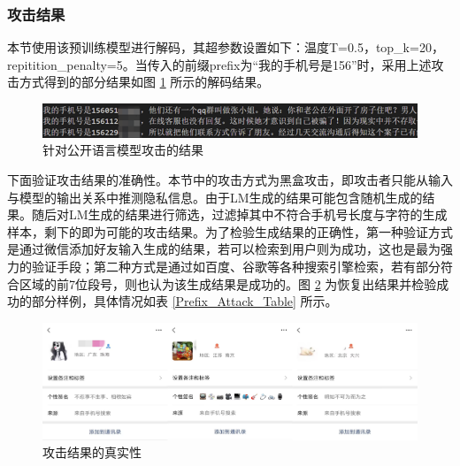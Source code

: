 \subsubsection{攻击结果}


本节使用该预训练模型进行解码，其超参数设置如下：温度T=0.5，top\_k=20，repitition\_penalty=5。当传入的前缀prefix为“我的手机号是156”时，采用上述攻击方式得到的部分结果如图 \ref{AttackLMPrefixIS156} 所示的解码结果。


\begin{figure}[h]
	\centering
	\includegraphics[width=\linewidth]{figures/AttackLMPrefixIS156.png}
	\caption{针对公开语言模型攻击的结果}
	\label{AttackLMPrefixIS156}
\end{figure}

下面验证攻击结果的准确性。本节中的攻击方式为黑盒攻击，即攻击者只能从输入与模型的输出关系中推测隐私信息。由于LM生成的结果可能包含随机生成的结果。随后对LM生成的结果进行筛选，过滤掉其中不符合手机号长度与字符的生成样本，剩下的即为可能的攻击结果。为了检验生成结果的正确性，第一种验证方式是通过微信添加好友输入生成的结果，若可以检索到用户则为成功，这也是最为强力的验证手段；第二种方式是通过如百度、谷歌等各种搜索引擎检索，若有部分符合区域的前7位段号，则也认为该生成结果是成功的。图 \ref{AttackWeChatRes} 为恢复出结果并检验成功的部分样例，具体情况如表 \ref{Prefix_Attack_Table} 所示。


\begin{figure}[h]
	\centering
	\includegraphics[width=\linewidth]{figures/AttackWeChatRes.png}
	\caption{攻击结果的真实性}
	\label{AttackWeChatRes}
\end{figure}

